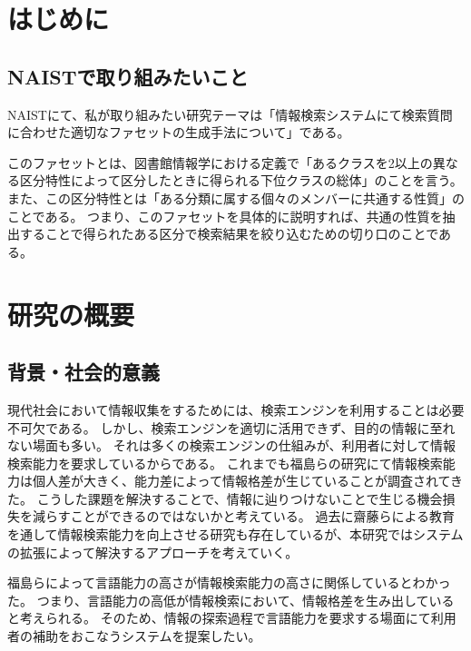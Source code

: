 \documentclass[a4j,10pt, twocolumn]{jarticle} \usepackage[dvipdfmx]{graphicx} \usepackage{amssymb} \usepackage{amsmath}
\begin{document}
\section{はじめに}
\subsection{NAISTで取り組みたいこと}
NAISTにて、私が取り組みたい研究テーマは「情報検索システムにて検索質問に合わせた適切なファセットの生成手法について」である。

このファセットとは、図書館情報学における定義で「あるクラスを2以上の異なる区分特性によって区分したときに得られる下位クラスの総体\cite{libdic}」のことを言う。
また、この区分特性とは「ある分類に属する個々のメンバーに共通する性質」のことである。
つまり、このファセットを具体的に説明すれば、共通の性質を抽出することで得られたある区分で検索結果を絞り込むための切り口のことである。
\section{研究の概要}
\subsection{背景・社会的意義}
 現代社会において情報収集をするためには、検索エンジンを利用することは必要不可欠である。
 しかし、検索エンジンを適切に活用できず、目的の情報に至れない場面も多い。
 それは多くの検索エンジンの仕組みが、利用者に対して情報検索能力を要求しているからである。
 これまでも福島らの研究にて情報検索能力は個人差が大きく、能力差によって情報格差が生じていることが調査されてきた\cite{fukushima}。
 こうした課題を解決することで、情報に辿りつけないことで生じる機会損失を減らすことができるのではないかと考えている。
 過去に齋藤らによる教育を通して情報検索能力を向上させる研究\cite{saito}も存在しているが、本研究ではシステムの拡張によって解決するアプローチを考えていく。

 福島らによって言語能力の高さが情報検索能力の高さに関係しているとわかった\cite{fukushima}。
 つまり、言語能力の高低が情報検索において、情報格差を生み出していると考えられる。
 そのため、情報の探索過程で言語能力を要求する場面にて利用者の補助をおこなうシステムを提案したい。
\end{document}
